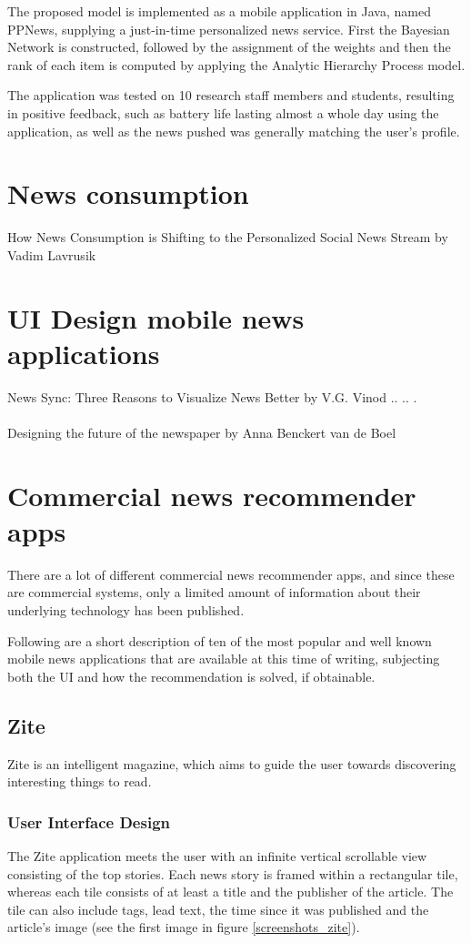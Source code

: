 The proposed model is implemented as a mobile application in Java, named PPNews, supplying a just-in-time personalized news service. First the Bayesian Network is constructed, followed by the assignment of the weights and then the rank of each item is computed by applying the Analytic Hierarchy Process model.

The application was tested on 10 research staff members and students, resulting in positive feedback, such as battery life lasting almost a whole day using the application, as well as the news pushed was generally matching the user's profile.

\section{News consumption}
How News Consumption is Shifting to the Personalized Social News Stream by Vadim Lavrusik

\section{UI Design mobile news applications}
News Sync: Three Reasons to Visualize News Better by V.G. Vinod .. .. .
\\\\
Designing the future of the newspaper by Anna Benckert van de Boel

\section{Commercial news recommender apps}
There are a lot of different commercial news recommender apps, and since these are commercial systems, only a limited amount of information about their underlying technology has been published.

Following are a short description of ten of the most popular and well known mobile news applications that are available at this time of writing, subjecting both the UI and how the recommendation is solved, if obtainable.


\subsection{Zite}
Zite is an intelligent magazine, which aims to guide the user towards discovering interesting things to read\cite{zite_appstore}.

\subsubsection{User Interface Design}
The Zite application meets the user with an infinite vertical scrollable view consisting of the top stories. Each news story is framed within a rectangular tile, whereas each tile consists of at least a title and the publisher of the article. The tile can also include tags, lead text, the time since it was published and the article's image (see the first image in figure \ref{screenshots_zite}).

